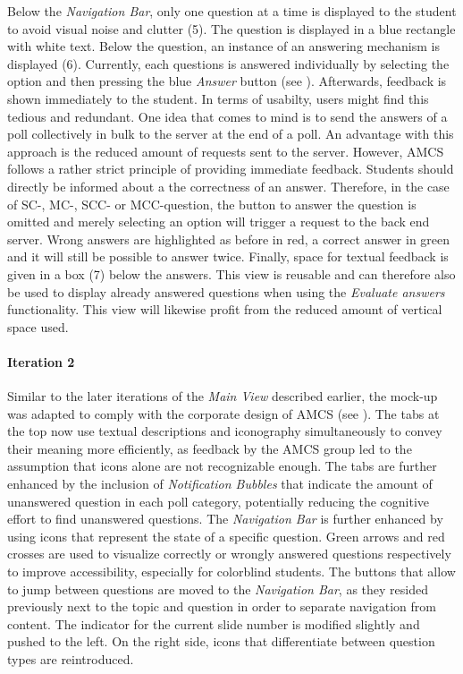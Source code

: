 \newline
\newline
Below the \emph{Navigation Bar}, only one question at a time is displayed to the student to avoid visual noise and clutter (5). The question is displayed in a blue rectangle with white text. Below the question, an instance of an answering mechanism is displayed (6). 
Currently, each questions is answered individually by selecting the option and then pressing the blue \emph{Answer} button (see ). Afterwards, feedback is shown immediately to the student. In terms of usabilty, users might find this tedious and redundant. One idea that comes to mind is to send the answers of a poll collectively in bulk to the server at the end of a poll. An advantage with this approach is the reduced amount of requests sent to the server. However, AMCS follows a rather strict principle of providing immediate feedback. Students should directly be informed about a the correctness of an answer.
Therefore, in the case of SC-, MC-, SCC- or MCC-question, the button to answer the question is omitted and merely selecting an option will trigger a request to the back end server.
Wrong answers are highlighted as before in red, a correct answer in green and it will still be possible to answer twice. Finally, space for textual feedback is given in a box (7) below the answers. This view is reusable and can therefore also be used to display already answered questions when using the \emph{Evaluate answers} functionality. This view will likewise profit from the reduced amount of vertical space used. 

\paragraph{Iteration 2}
Similar to the later iterations of the \emph{Main View} described earlier, the mock-up was adapted to comply with the corporate design of AMCS (see ).
The tabs at the top now use textual descriptions and iconography simultaneously to convey their meaning more efficiently, as feedback by the AMCS group led to the assumption that icons alone are not recognizable enough. The tabs are further enhanced by the inclusion of \emph{Notification Bubbles} that indicate the amount of unanswered question in each poll category, potentially reducing the cognitive effort to find unanswered questions.
The \emph{Navigation Bar} is further enhanced by using icons that represent the state of a specific question. Green arrows and red crosses are used to visualize correctly or wrongly answered questions respectively to improve accessibility, especially for colorblind students.
The buttons that allow to jump between questions are moved to the \emph{Navigation Bar}, as they resided previously next to the topic and question in order to separate navigation from content.
The indicator for the current slide number is modified slightly and pushed to the left. On the right side, icons that differentiate between question types are reintroduced. 
